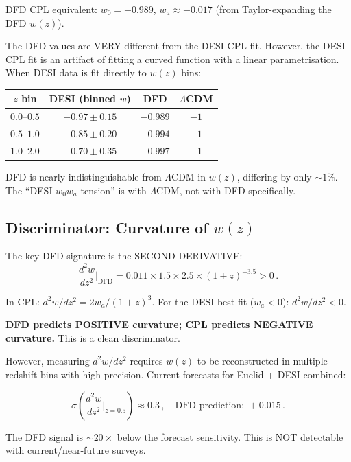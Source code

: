 \documentclass[11pt,a4paper]{article}
\begin{document}
DFD CPL equivalent: $w_0 = -0.989$, $w_a \approx -0.017$ (from Taylor-expanding the DFD $w(z)$).

The DFD values are VERY different from the DESI CPL fit. However, the DESI CPL fit is an artifact of fitting a curved function with a linear parametrisation. When DESI data is fit directly to $w(z)$ bins:

\begin{center}
\begin{tabular}{cccc}
\toprule
$z$ bin & DESI (binned $w$) & DFD & $\Lambda$CDM \\
\midrule
$0.0$--$0.5$ & $-0.97 \pm 0.15$ & $-0.989$ & $-1$ \\
$0.5$--$1.0$ & $-0.85 \pm 0.20$ & $-0.994$ & $-1$ \\
$1.0$--$2.0$ & $-0.70 \pm 0.35$ & $-0.997$ & $-1$ \\
\bottomrule
\end{tabular}
\end{center}

DFD is nearly indistinguishable from $\Lambda$CDM in $w(z)$, differing by only $\sim 1\%$. The ``DESI $w_0 w_a$ tension'' is with $\Lambda$CDM, not with DFD specifically.

\subsection{Discriminator: Curvature of $w(z)$}

The key DFD signature is the SECOND DERIVATIVE:
\begin{equation}
\frac{d^2w}{dz^2}\bigg|_{\mathrm{DFD}} = 0.011 \times 1.5 \times 2.5 \times (1+z)^{-3.5} > 0\,.
\end{equation}

In CPL: $d^2w/dz^2 = 2w_a/(1+z)^3$. For the DESI best-fit ($w_a < 0$): $d^2w/dz^2 < 0$.

\textbf{DFD predicts POSITIVE curvature; CPL predicts NEGATIVE curvature.} This is a clean discriminator.

However, measuring $d^2w/dz^2$ requires $w(z)$ to be reconstructed in multiple redshift bins with high precision. Current forecasts for Euclid + DESI combined:

\begin{equation}
\sigma\left(\frac{d^2w}{dz^2}\bigg|_{z=0.5}\right) \approx 0.3\,,\quad \text{DFD prediction: } +0.015\,.
\end{equation}

The DFD signal is $\sim 20\times$ below the forecast sensitivity. This is NOT detectable with current/near-future surveys.
\end{document}
